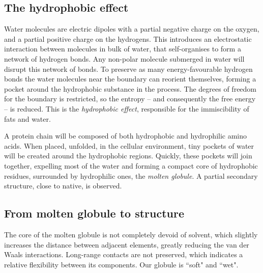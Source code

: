 
\FloatBarrier
\subsection{The hydrophobic effect}
Water molecules are electric dipoles with a partial negative charge on the oxygen, and a partial positive charge on the hydrogens.
This introduces an electrostatic interaction between molecules in bulk of water, that self-organises to form a network of hydrogen bonds.
Any non-polar molecule submerged in water will disrupt this network of bonds.
To preserve as many energy-favourable hydrogen bonds the water molecules near the boundary can reorient themselves, forming a pocket around the hydrophobic substance in the process.
The degrees of freedom for the boundary is restricted, so the entropy -- and consequently the free energy -- is reduced.
This is the \emph{hydrophobic effect}, responsible for the immiscibility of fats and water.

A protein chain 
will be composed of both hydrophobic and hydrophilic amino acids.
When placed, unfolded, in the cellular environment, tiny pockets of water will be created around the hydrophobic regions.
Quickly, these pockets will join together, expelling most of the water and forming a compact core of hydrophobic residues, surrounded by hydrophilic ones, the \emph{molten globule}.
A partial secondary structure, close to native, is observed.

\subsection{From molten globule to structure}
The core of the molten globule is not completely devoid of solvent, which slightly increases the distance between adjacent elements, greatly reducing the van der Waals interactions.
Long-range contacts are not preserved, which indicates a relative flexibility between its components.
Our globule is ``soft" and ``wet".

